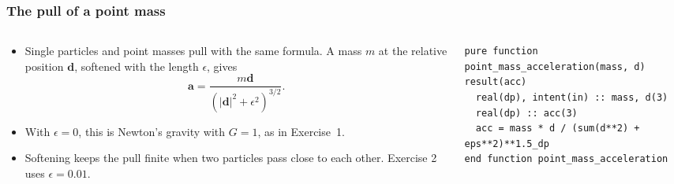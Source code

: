 \begin{frame}[fragile]
  \frametitle{The pull of a point mass}
  \begin{columns}[T]
    \begin{column}{0.42\textwidth}
      \begin{itemize}
        \item Single particles and point masses pull with the same formula. A mass $m$ at the relative position $\mathbf{d}$, softened with the length $\epsilon$, gives
          \[ \mathbf{a} = \frac{m \mathbf{d}}{(|\mathbf{d}|^2 + \epsilon^2)^{3/2}}. \]
        \item With $\epsilon = 0$, this is Newton's gravity with $G = 1$, as in Exercise~1.
        \item Softening keeps the pull finite when two particles pass close to each other. Exercise 2 uses $\epsilon = 0.01$.
      \end{itemize}
    \end{column}

    \begin{column}{0.58\textwidth}
      \begin{lstlisting}
pure function point_mass_acceleration(mass, d) result(acc)
  real(dp), intent(in) :: mass, d(3)
  real(dp) :: acc(3)
  acc = mass * d / (sum(d**2) + eps**2)**1.5_dp
end function point_mass_acceleration
      \end{lstlisting}

      \centering
    \end{column}
  \end{columns}
\end{frame}



